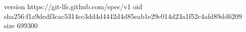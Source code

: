 version https://git-lfs.github.com/spec/v1
oid sha256:f1a9dedf3cac5314cc3dd4d4442d4d85eab1e29c014d23a1f52c4afd89dd6209
size 699300
